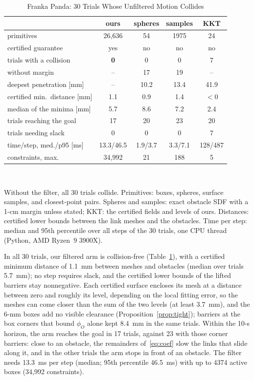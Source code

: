\documentclass[journal]{IEEEtran}
\theoremstyle{definition}
\newcommand{\timeFrankaMed}{13.3}\newcommand{\timeFrankaPninetyfive}{46.5}
\newcommand{\timeOurs}{13.3/46.5}\newcommand{\timeSph}{1.9/3.7}\newcommand{\timePts}{3.3/7.1}\newcommand{\timeKKT}{128/487}
\begin{document}
\begin{table}[t]
\caption{Franka Panda: 30 Trials Whose Unfiltered Motion Collides}
\label{tab:franka}
\centering
\footnotesize
\setlength{\tabcolsep}{2pt}
\renewcommand{\arraystretch}{1.05}
\begin{tabular}{lcccc}
\toprule
& ours & spheres & samples & KKT\\
\midrule
primitives & 26{,}636 & 54 & 1975 & 24\\
certified guarantee & yes & no & no & no\\
trials with a collision & \textbf{0} & 0 & 0 & 7\\
\quad without margin & -- & 17 & 19 & --\\
\quad deepest penetration [mm] & -- & 10.2 & 13.4 & 41.9\\
certified min.\ distance [mm] & 1.1 & 0.9 & 1.4 & $<0$\\
median of the minima [mm] & 5.7 & 8.6 & 7.2 & 2.4\\
trials reaching the goal & 17 & 20 & 23 & 20\\
trials needing slack & 0 & 0 & 0 & 7\\
time/step, med./p95 [ms] & \timeOurs & \timeSph & \timePts & \timeKKT\\
constraints, max. & 34{,}992 & 21 & 188 & 5\\
\bottomrule
\end{tabular}
\\[3pt]
\parbox{\columnwidth}{\footnotesize Without the filter, all 30 trials collide. Primitives: boxes,
spheres, surface samples, and closest-point pairs. Spheres and samples: exact obstacle SDF with a
1-cm margin unless stated; KKT: the certified fields and levels of ours. Distances: certified lower
bounds between the link meshes and the obstacles. Time per step: median and 95th percentile over all steps of the 30 trials, one CPU thread
(Python, AMD Ryzen~9 3900X).}
\end{table}

In all 30 trials, our filtered arm is collision-free (Table~\ref{tab:franka}), with a certified
minimum distance of 1.1~mm between meshes and obstacles (median over trials 5.7~mm); no step
requires slack, and the certified lower bounds of the lifted barriers stay nonnegative. Each certified
surface encloses its mesh at a distance between zero and roughly its level, depending on the local
fitting error, so the meshes can come closer than the sum of the two levels (at least 3.7~mm), and the
6-mm boxes add no visible clearance (Proposition~\ref{prop:tight}); barriers at the box corners that
bound $\phi_O$ alone kept 8.4~mm in the same trials. Within the 10-s horizon, the arm reaches the goal in 17 trials, against
23 with those corner barriers: close to an obstacle, the remainders of~\eqref{eq:coef} slow the links
that slide along it, and in the other trials the arm stops in front of an obstacle. The filter needs
\timeFrankaMed~ms per step (median; 95th percentile \timeFrankaPninetyfive~ms) with up to 4374 active
boxes (34{,}992 constraints).
\end{document}
